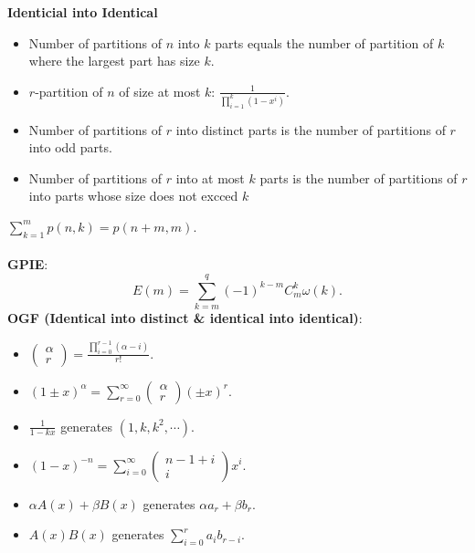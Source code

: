\documentclass[11pt]{article}
\begin{document}
\begin{multicols*}{3}
        \textbf{Identicial into Identical}
        \begin{itemize}
            \item Number of partitions of $n$ into $k$ parts equals the number of partition of $k$ where the largest part has size $k$.
            \item $r$-partition of $n$ of size at most $k$: $\frac{1}{\prod_{i = 1}^{k}(1 - x^i)}$.
            \item Number of partitions of $r$ into distinct parts is the number of partitions of $r$ into odd parts.
            \item Number of partitions of $r$ into at most $k$ parts is the number of partitions of $r$ into parts whose size does not excced $k$
        \end{itemize}
        $\sum_{k = 1}^{m}p(n, k) = p(n + m, m)$.
        \\\\
        \textbf{GPIE}: 
        \begin{equation*}
            E(m) = \sum_{k = m}^{q}(-1)^{k - m}C^k_m\omega(k).
        \end{equation*}
        \textbf{OGF (Identical into distinct \& identical into identical)}:
        \begin{itemize}
            \item $\begin{pmatrix}
                \alpha \\
                r
            \end{pmatrix} = \frac{\prod_{i = 0}^{r - 1}(\alpha - i)}{r!}$.
            \item $(1 \pm x)^\alpha = \sum_{r = 0}^{\infty}\begin{pmatrix}
                \alpha \\
                r
            \end{pmatrix}(\pm x)^r$.
            \item $\frac{1}{1 - kx}$ generates $(1, k, k^2, \cdots)$.
            \item $(1 - x)^{-n} = \sum_{i = 0}^{\infty}\begin{pmatrix}
                n - 1 + i \\
                i
            \end{pmatrix}x^i$.
            \item $\alpha A(x) + \beta B(x)$ generates $\alpha a_r + \beta b_r$.
            \item $A(x)B(x)$ generates $\sum_{i = 0}^{r}a_ib_{r - i}$.

\end{itemize}
\end{multicols*}
\end{document}
